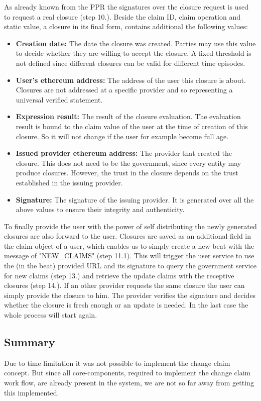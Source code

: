 As already known from the PPR the signatures over the closure request is used to request a real closure (step 10.). Beside the claim ID, claim operation and static value, a closure in its final form, contains additional the following values: 

\begin{itemize}
\item \textbf{Creation date:} The date the closure was created. Parties may use this value to decide whether they are willing to accept the closure. A fixed threshold is not defined since different closures can be valid for different time episodes. 
\item \textbf{User’s ethereum address:} The address of the user this closure is about. Closures are not addressed at a specific provider and so representing a universal verified statement. 
\item \textbf{Expression result:} The result of the closure evaluation. The evaluation result is bound to the claim value of the user at the time of creation of this closure. So it will not change if the user for example become full age. 
\item \textbf{Issued provider ethereum address:} The provider that created the closure. This does not need to be the government, since every entity may produce closures. However, the trust in the closure depends on the trust established in the issuing provider. 
\item \textbf{Signature:} The signature of the issuing provider. It is generated over all the above values to ensure their integrity and authenticity. 
\end{itemize} 

To finally provide the user with the power of self distributing the newly generated closures are also forward to the user. Closures are saved as an additional field in the claim object of a user, which enables us to simply create a new beat with the message of "NEW\_CLAIMS" (step 11.1). This will trigger the user service to use the (in the beat) provided URL and its signature to query the government service for new claims (step 13.) and retrieve the update claims with the receptive closures (step 14.). If an other provider requests the same closure the user can simply provide the closure to him. The provider verifies the signature and decides whether the closure is fresh enough or an update is needed. In the last case the whole process will start again. 

\subsection{Summary}
\label{sec:coreSummary}
Due to time limitation it was not possible to implement the change claim concept. But since all core-components, required to implement the change claim work flow, are already present in the system, we are not so far away from getting this implemented.

